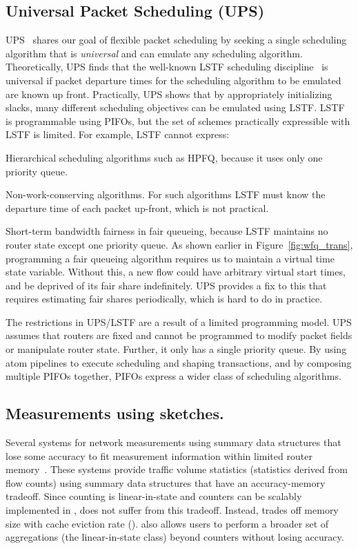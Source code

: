 \subsection{Universal Packet Scheduling (UPS)} UPS~\cite{ups} shares our goal
of flexible packet scheduling by seeking a single scheduling algorithm that is
{\em universal} and can emulate any scheduling algorithm. Theoretically, UPS
finds that the well-known LSTF scheduling discipline~\cite{lstf} is universal
if packet departure times for the scheduling algorithm to be emulated are known
up front. Practically, UPS shows that by appropriately initializing slacks,
many different scheduling objectives can be emulated using LSTF. LSTF is
programmable using PIFOs, but the set of schemes practically expressible with
LSTF is limited. For example, LSTF cannot express:
\begin{CompactEnumerate}
\item Hierarchical scheduling algorithms such as HPFQ, because it
  uses only one priority queue.
\item Non-work-conserving algorithms. For such algorithms LSTF must know the
  departure time of each packet up-front, which is not practical.
\item Short-term bandwidth fairness in fair queueing, because LSTF maintains no
  router state except one priority queue. As shown earlier in
  Figure~\ref{fig:wfq_trans}, programming a fair queueing algorithm requires us
  to maintain a virtual time state variable. Without this, a new flow could have
  arbitrary virtual start times, and be deprived of its fair share indefinitely.
  UPS provides a fix to this that requires estimating fair shares periodically,
  which is hard to do in practice.
\end{CompactEnumerate}
The restrictions in UPS/LSTF are a result of a limited programming model. UPS
assumes that routers are fixed and cannot be programmed to modify packet fields
or manipulate router state. Further, it only has a single priority queue.  By
using atom pipelines to execute scheduling and shaping transactions, and by
composing multiple PIFOs together, PIFOs express a wider class of scheduling
algorithms.

\subsection{Measurements using sketches.} Several systems for network
measurements using summary data structures that lose some accuracy to fit
measurement information within limited router memory~\cite{univmon, flowradar,
counterbraids, dream, progme, opensketch}. These systems provide traffic volume
statistics (\ie statistics derived from flow counts) using summary data
structures that have an accuracy-memory tradeoff. Since counting is
linear-in-state and counters can be scalably implemented in \TheSystem,
\TheSystem does not suffer from this tradeoff. Instead, \TheSystem trades off
memory size with cache eviction rate ().  \TheSystem also allows
users to perform a broader set of aggregations (the linear-in-state class)
beyond counters without losing accuracy.

